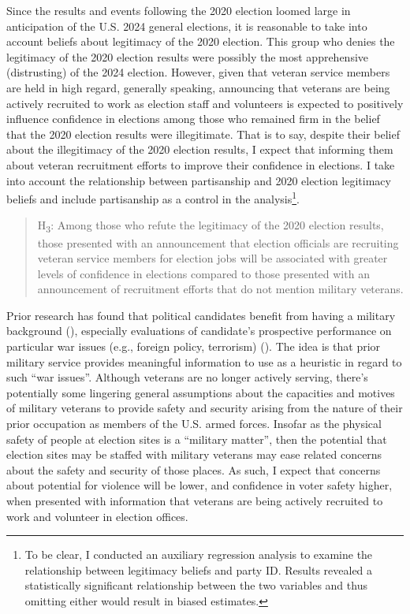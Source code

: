 \documentclass[
  12pt,
  letterpaper,
]{article}
\begin{document}
Since the results and events following the 2020 election loomed large in
anticipation of the U.S. 2024 general elections, it is reasonable to
take into account beliefs about legitimacy of the 2020 election. This
group who denies the legitimacy of the 2020 election results were
possibly the most apprehensive (distrusting) of the 2024 election.
However, given that veteran service members are held in high regard,
generally speaking, announcing that veterans are being actively
recruited to work as election staff and volunteers is expected to
positively influence confidence in elections among those who remained
firm in the belief that the 2020 election results were illegitimate.
That is to say, despite their belief about the illegitimacy of the 2020
election results, I expect that informing them about veteran recruitment
efforts to improve their confidence in elections. I take into account
the relationship between partisanship and 2020 election legitimacy
beliefs and include partisanship as a control in the
analysis\footnote{To be clear, I conducted an auxiliary regression
  analysis to examine the relationship between legitimacy beliefs and
  party ID. Results revealed a statistically significant relationship
  between the two variables and thus omitting either would result in
  biased estimates.}.

\begin{quote}
H\textsubscript{3}: Among those who refute the legitimacy of the 2020
election results, those presented with an announcement that election
officials are recruiting veteran service members for election jobs will
be associated with greater levels of confidence in elections compared to
those presented with an announcement of recruitment efforts that do not
mention military veterans.
\end{quote}

Prior research has found that political candidates benefit from having a
military background (), especially evaluations of candidate's prospective
performance on particular war issues (e.g., foreign policy, terrorism)
(). The idea is that prior
military service provides meaningful information to use as a heuristic
in regard to such ``war issues''. Although veterans are no longer
actively serving, there's potentially some lingering general assumptions
about the capacities and motives of military veterans to provide safety
and security arising from the nature of their prior occupation as
members of the U.S. armed forces. Insofar as the physical safety of
people at election sites is a ``military matter'', then the potential
that election sites may be staffed with military veterans may ease
related concerns about the safety and security of those places. As such,
I expect that concerns about potential for violence will be lower, and
confidence in voter safety higher, when presented with information that
veterans are being actively recruited to work and volunteer in election
offices.
\end{document}
